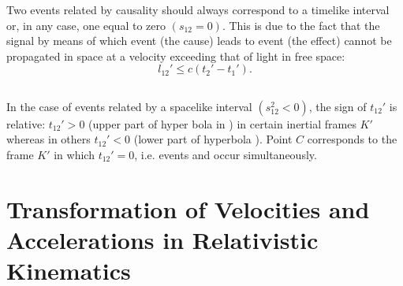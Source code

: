 Two events related by causality should always correspond to a timelike interval or, in any case, one equal to zero $(s_{12} = 0)$. This is due to the fact that the signal by means of which event  (the cause) leads to event  (the effect) cannot be propagated in space at a velocity exceeding that of light in free space:
\begin{equation*}%
l_{12}' \leqslant c (t_{2}' - t_{1}').
\end{equation*}


\subsection{}\label{5.4.10} In the case of events related by a spacelike interval $(s_{12}^{2}< 0)$, the sign of $t_{12}'$ is relative: $t_{12}' > 0$ (upper part of hyper­ bola  in ) in certain inertial frames $K'$ whereas in others $t_{12}' < 0$ (lower part of hyperbola ). Point $C$ corres­ponds to the frame $K'$ in which $t_{12}' = 0$, i.e. events  and  occur simultaneously.


\section[Transformation of Velocities and Accelerations]{Transformation of Velocities and Accelerations in Relativistic Kinematics}
\label{sec-5.5}


